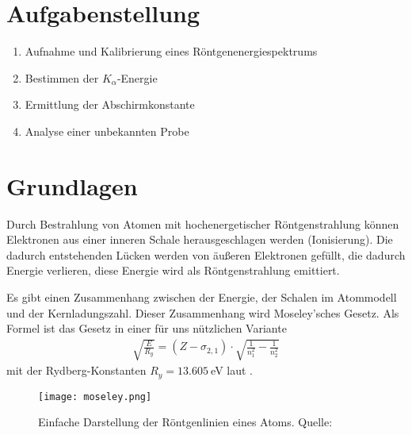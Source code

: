 \documentclass{article}
\begin{document}
\parindent0cm

\renewcommand{\max}{\operatorname{max}}


\tableofcontents
\newpage

\pagestyle{fancy}

\section{Aufgabenstellung}

\begin{enumerate}
\item Aufnahme und Kalibrierung eines Röntgenenergiespektrums
\item Bestimmen der $K_\alpha$-Energie
\item Ermittlung der Abschirmkonstante
\item Analyse einer unbekannten Probe
\end{enumerate}



\section{Grundlagen}

Durch Bestrahlung von Atomen mit hochenergetischer Röntgenstrahlung können Elektronen aus einer inneren Schale herausgeschlagen werden (Ionisierung). Die dadurch entstehenden Lücken werden von äußeren Elektronen gefüllt, die dadurch Energie verlieren, diese Energie wird als Röntgenstrahlung emittiert.

Es gibt einen Zusammenhang zwischen der Energie, der Schalen im Atommodell und der Kernladungszahl. Dieser Zusammenhang wird Moseley'sches Gesetz. Als Formel ist das Gesetz in einer für uns nützlichen Variante
\begin{align}
\sqrt{\frac{E}{R_y}} = (Z - \sigma_{2,1}) \cdot \sqrt{ \frac{1}{n_1^2} - \frac{1}{n_2^2}}
\label{eq:moseley}
\end{align}
mit der Rydberg-Konstanten $R_y = 13.605~$eV laut \cite{ry}.



\begin{figure}[H]
\texttt{[image: moseley.png]}
\caption{Einfache Darstellung der Röntgenlinien eines Atoms. Quelle: \cite{moodle}}
\label{fig:moseley}

\end{figure}
\end{document}
